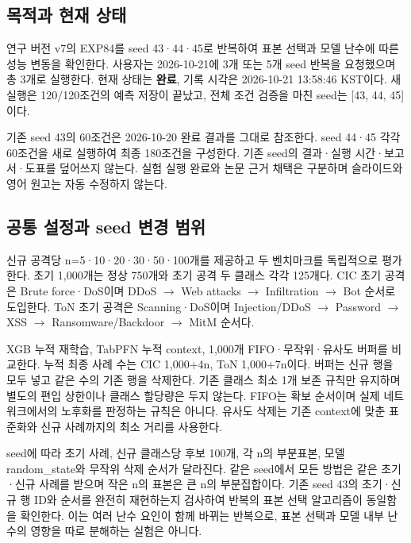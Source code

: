 

\subsection{목적과 현재 상태}
연구 버전 v7의 EXP84를 seed 43·44·45로 반복하여 표본 선택과 모델 난수에 따른 성능 변동을 확인한다. 사용자는 2026-10-21에 3개 또는 5개 seed 반복을 요청했으며 총 3개로 실행한다. 현재 상태는 \textbf{완료}, 기록 시각은 2026-10-21 13:58:46 KST이다. 새 실행은 120/\allowbreak{}120조건의 예측 저장이 끝났고, 전체 조건 검증을 마친 seed는 [43, 44, 45]이다.

기존 seed 43의 60조건은 2026-10-20 완료 결과를 그대로 참조한다. seed 44·45 각각 60조건을 새로 실행하여 최종 180조건을 구성한다. 기존 seed의 결과·실행 시간·보고서·도표를 덮어쓰지 않는다. 실험 실행 완료와 논문 근거 채택은 구분하며 슬라이드와 영어 원고는 자동 수정하지 않는다.

\subsection{공통 설정과 seed 변경 범위}
신규 공격당 n=\allowbreak{}5·10·20·30·50·100개를 제공하고 두 벤치마크를 독립적으로 평가한다. 초기 1,000개는 정상 750개와 초기 공격 두 클래스 각각 125개다. CIC 초기 공격은 Brute force·DoS이며 DDoS  \ensuremath{\rightarrow}  Web attacks  \ensuremath{\rightarrow}  Infiltration  \ensuremath{\rightarrow}  Bot 순서로 도입한다. ToN 초기 공격은 Scanning·DoS이며 Injection/\allowbreak{}DDoS  \ensuremath{\rightarrow}  Password  \ensuremath{\rightarrow}  XSS  \ensuremath{\rightarrow}  Ransomware/\allowbreak{}Backdoor  \ensuremath{\rightarrow}  MitM 순서다.

XGB 누적 재학습, TabPFN 누적 context, 1,000개 FIFO·무작위·유사도 버퍼를 비교한다. 누적 최종 사례 수는 CIC 1,000+\allowbreak{}4n, ToN 1,000+\allowbreak{}7n이다. 버퍼는 신규 행을 모두 넣고 같은 수의 기존 행을 삭제한다. 기존 클래스 최소 1개 보존 규칙만 유지하며 별도의 편입 상한이나 클래스 할당량은 두지 않는다. FIFO는 확보 순서이며 실제 네트워크에서의 노후화를 판정하는 규칙은 아니다. 유사도 삭제는 기존 context에 맞춘 표준화와 신규 사례까지의 최소 거리를 사용한다.

seed에 따라 초기 사례, 신규 클래스당 후보 100개, 각 n의 부분표본, 모델 random\_\allowbreak{}state와 무작위 삭제 순서가 달라진다. 같은 seed에서 모든 방법은 같은 초기·신규 사례를 받으며 작은 n의 표본은 큰 n의 부분집합이다. 기존 seed 43의 초기·신규 행 ID와 순서를 완전히 재현하는지 검사하여 반복의 표본 선택 알고리즘이 동일함을 확인한다. 이는 여러 난수 요인이 함께 바뀌는 반복으로, 표본 선택과 모델 내부 난수의 영향을 따로 분해하는 실험은 아니다.

